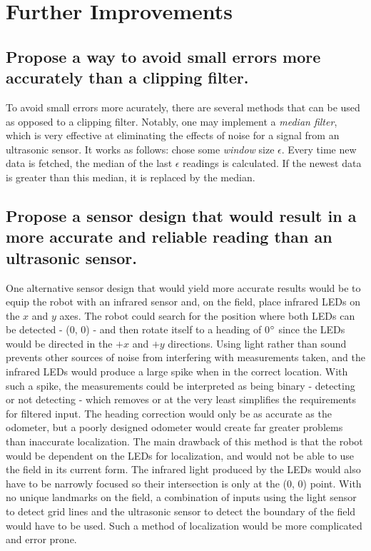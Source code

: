 \documentclass[11pt]{article}
\begin{document}
\section{Further Improvements}
\subsection{Propose a way to avoid small errors more accurately than a clipping filter.}
To avoid small errors more acurately, there are several methods that can be used as opposed to a
clipping filter. Notably, one may implement a \textit{median filter}, which is very effective at
eliminating the effects of noise for a signal from an ultrasonic sensor. It works as follows: chose
some \textit{window} size $\epsilon$. Every time new data is fetched, the median of the last
$\epsilon$
readings is calculated. If the newest data is greater than this median, it is replaced by the
median.

\subsection{Propose a sensor design that would result in a more accurate and reliable reading than
an ultrasonic sensor.}
\par One alternative sensor design that would yield more accurate results would be to equip the
robot with an infrared sensor and, on the field, place infrared LEDs on the $x$ and $y$ axes. The
robot could search for the position where both LEDs can be detected - (0, 0) - and then rotate
itself to a heading of 0$\degree$ since the LEDs would be directed in the $+x$ and $+y$ directions.
Using light rather than sound prevents other sources of noise from interfering with measurements
taken, and the infrared LEDs would produce a large spike when in the correct location. With such a
spike, the measurements could be interpreted as being binary - detecting or not detecting - which
removes or at the very least simplifies the requirements for filtered input. The heading correction
would only be as accurate as the odometer, but a poorly designed odometer would create far greater
problems than inaccurate localization. The main drawback of this method is that the robot would be
dependent on the LEDs for localization, and would not be able to use the field in its current form.
The infrared light produced by the LEDs would also have to be narrowly focused so their intersection
is only at the (0, 0) point. With no unique landmarks on the field, a combination of inputs using
the light sensor to detect grid lines and the ultrasonic sensor to detect the boundary of the field
would have to be used. Such a method of localization would be more complicated and error prone.
\end{document}
